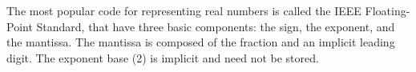 \documentclass[11pt]{article}
\begin{document}
The most popular code for representing real numbers is called the IEEE Floating-Point Standard, that have three basic components: the sign, the exponent, and the mantissa. The mantissa is composed of the fraction and an implicit leading digit. The exponent base (2) is implicit and need not be stored.\\



\end{document}
